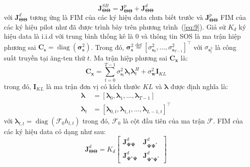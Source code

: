 \begin{equation}
    \label{eq:17}
    \mathbf{J}_{\boldsymbol{\Theta} \boldsymbol{\Theta}}^{SB}= \mathbf{J}_{\boldsymbol{\Theta} \boldsymbol{\Theta}}^{p} + \mathbf{J}_{\boldsymbol{\Theta} \boldsymbol{\Theta}}^{d}
\end{equation}
với $\mathbf{J}_{\boldsymbol{\Theta} \boldsymbol{\Theta}}^{d}$ tương ứng là FIM của các ký hiệu data chưa biết trước và $\mathbf{J}_{\boldsymbol{\Theta} \boldsymbol{\Theta}}^{p}$ FIM của các ký hiệu pilot như đã được trình bày trên phương trình~(\ref{eq:9}). Giả sử $K_d$ ký hiệu data là i.i.d với trung bình thống kê là $0$ và thông tin SOS là ma trận hiệp phương sai $\mathbf{C}_{\mathbf{s}}=\operatorname{diag}\left(\boldsymbol{\sigma}_{\mathbf{s}}^{2}\right)$. Trong đó, $\boldsymbol{\sigma}_{\mathbf{s}}^{2} \stackrel{\operatorname{def}}{=}\left[\sigma_{\mathbf{s}_{0}}^{2}, \ldots, \sigma_{\mathbf{s}_{T-1}}^{2}\right]^\top$ với $\sigma_{\mathbf{s}_t^{2}}$ là công suất truyền tại ăng-ten thứ $t$. Ma trận hiệp phương sai $\mathbf{C}_{\mathbf{x}}$ là:
\begin{equation}
    \mathbf{C}_{\mathbf{x}}=\sum_{t=0}^{T-1} \sigma_{\mathbf{s}_{t}}^{2} \boldsymbol{\lambda}_{t} \boldsymbol{\lambda}_{t}^{H}+\sigma_{\mathbf{w}}^{2} \mathbf{I}_{K L}
\end{equation}
trong đó, $\mathbf{I}_{KL}$ là ma trận đơn vị có kích thước $K L$ và $\boldsymbol{\lambda}$ được định nghĩa là:
\begin{equation}
    \begin{aligned}
        \boldsymbol{\lambda} &=\left[\boldsymbol{\lambda}_{0}, \boldsymbol{\lambda}_{1}, \ldots, \boldsymbol{\lambda}_{T-1}\right] \\ 
        \boldsymbol{\lambda}_{t}&=\left[\boldsymbol{\lambda}_{0, t}, \boldsymbol{\lambda}_{1, t}, \ldots, \boldsymbol{\lambda}_{L-1, t}\right]^{\top}
    \end{aligned}
\end{equation}
với $\boldsymbol{\lambda}_{l, t}=\operatorname{diag}\left(\mathcal{F}_0 h_{l, t}\right)$ trong đó, $\mathcal{F}_0$ là cột đầu tiên của ma trận $\mathcal{F}$. FIM của các ký hiệu data có dạng như sau:
\begin{equation}
    \mathbf{J}_{\boldsymbol{\Theta} \boldsymbol{\Theta}}^{d}=K_{d}\left[\begin{array}{cc}
    \mathbf{J}_{\boldsymbol{\Psi} \boldsymbol{\Psi}}^{d} & \mathbf{J}_{\boldsymbol{\Psi} \boldsymbol{\Psi}^{*}}^{d} \\
    \mathbf{J}_{\boldsymbol{\Psi}^{\star} \boldsymbol{\Psi}}^{d} & \mathbf{J}_{\boldsymbol{\Psi}^{\star} \boldsymbol{\Psi}^{*}}^{d}
    \end{array}\right]
\end{equation}

